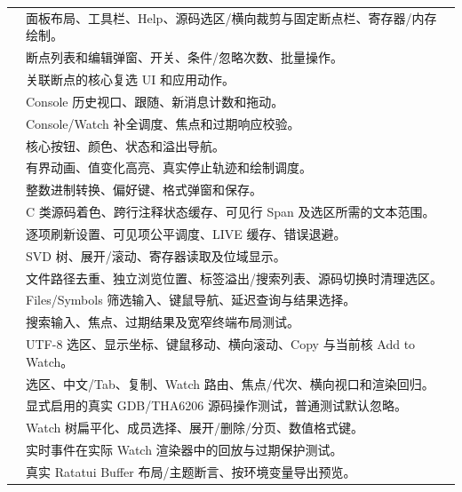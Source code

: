 \documentclass[UTF8,a4paper,11pt,oneside,fontset=none]{ctexart}
\begin{document}
\begin{longtable}{@{}P{55mm}P{106mm}@{}}
 & 面板布局、工具栏、Help、源码选区/横向裁剪与固定断点栏、寄存器/内存绘制。\\
 & 断点列表和编辑弹窗、开关、条件/忽略次数、批量操作。\\
 & 关联断点的核心复选 UI 和应用动作。\\
 & Console 历史视口、跟随、新消息计数和拖动。\\
 & Console/Watch 补全调度、焦点和过期响应校验。\\
 & 核心按钮、颜色、状态和溢出导航。\\
 & 有界动画、值变化高亮、真实停止轨迹和绘制调度。\\
 & 整数进制转换、偏好键、格式弹窗和保存。\\
 & C 类源码着色、跨行注释状态缓存、可见行 Span 及选区所需的文本范围。\\
 & 逐项刷新设置、可见项公平调度、LIVE 缓存、错误退避。\\
 & SVD 树、展开/滚动、寄存器读取及位域显示。\\
 & 文件路径去重、独立浏览位置、标签溢出/搜索列表、源码切换时清理选区。\\
 & Files/Symbols 筛选输入、键鼠导航、延迟查询与结果选择。\\
 & 搜索输入、焦点、过期结果及宽窄终端布局测试。\\
 & UTF-8 选区、显示坐标、键鼠移动、横向滚动、Copy 与当前核 Add to Watch。\\
 & 选区、中文/Tab、复制、Watch 路由、焦点/代次、横向视口和渲染回归。\\
 & 显式启用的真实 GDB/THA6206 源码操作测试，普通测试默认忽略。\\
 & Watch 树扁平化、成员选择、展开/删除/分页、数值格式键。\\
 & 实时事件在实际 Watch 渲染器中的回放与过期保护测试。\\
 & 真实 Ratatui Buffer 布局/主题断言、按环境变量导出预览。\\\bottomrule
\end{longtable}
\end{document}
